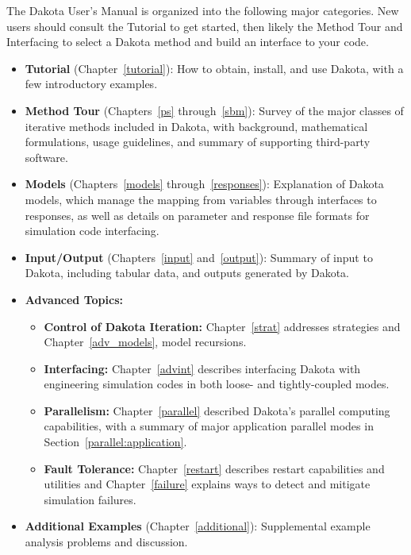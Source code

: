 The Dakota User's Manual is organized into the following major
categories.  New users should consult the Tutorial to get started,
then likely the Method Tour and Interfacing to select a Dakota method
and build an interface to your code.
\begin{itemize}

\item {\bf Tutorial} (Chapter~\ref{tutorial}): How to obtain, install,
  and use Dakota, with a few introductory examples.

\item {\bf Method Tour} (Chapters~\ref{ps} through~\ref{sbm}): Survey
  of the major classes of iterative methods included in Dakota, with
  background, mathematical formulations, usage guidelines, and summary
  of supporting third-party software.

\item {\bf Models} (Chapters~\ref{models} through~\ref{responses}):
  Explanation of Dakota models, which manage the mapping from
  variables through interfaces to responses, as well as details on
  parameter and response file formats for simulation code interfacing.

\item {\bf Input/Output} (Chapters~\ref{input} and~\ref{output}):
  Summary of input to Dakota, including tabular data, and outputs
  generated by Dakota.

\item {\bf Advanced Topics:}
  \begin{itemize}

  \item {\bf Control of Dakota Iteration:} Chapter~\ref{strat}
    addresses strategies and Chapter~\ref{adv_models}, model
    recursions.

  \item {\bf Interfacing:} Chapter~\ref{advint} describes interfacing
    Dakota with engineering simulation codes in both loose- and
    tightly-coupled modes.

  \item {\bf Parallelism:} Chapter~\ref{parallel} described Dakota's
    parallel computing capabilities, with a summary of major
    application parallel modes in Section~\ref{parallel:application}.

  \item {\bf Fault Tolerance:} Chapter~\ref{restart} describes restart
    capabilities and utilities and Chapter~\ref{failure} explains ways
    to detect and mitigate simulation failures.

  \end{itemize}

\item {\bf Additional Examples} (Chapter~\ref{additional}):
  Supplemental example analysis problems and discussion.

\end{itemize}

